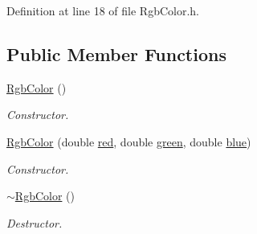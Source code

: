 Definition at line 18 of file RgbColor.h.\subsection*{Public Member Functions}
\begin{CompactItemize}
\item 
\hyperlink{struct_rgb_color_264da0270aca412d62197e046b71b08e}{RgbColor} ()
\begin{CompactList}\small\item\em Constructor. \item\end{CompactList}\item 
\hyperlink{struct_rgb_color_22ba5d2a596e39ca39b835b5571fd2c0}{RgbColor} (double \hyperlink{struct_rgb_color_fad3108eb5b0c11d4a63aaed7d1e4b96}{red}, double \hyperlink{struct_rgb_color_2af04c7110fa165ce281f92177655e74}{green}, double \hyperlink{struct_rgb_color_497f845fced68cbe4fabb5c34d05f682}{blue})
\begin{CompactList}\small\item\em Constructor. \item\end{CompactList}\item 
\hyperlink{struct_rgb_color_1d4e0b01edaea01389a3fd3e02ed9f74}{$\sim$RgbColor} ()
\begin{CompactList}\small\item\em Destructor. \item\end{CompactList}\end{CompactItemize}
